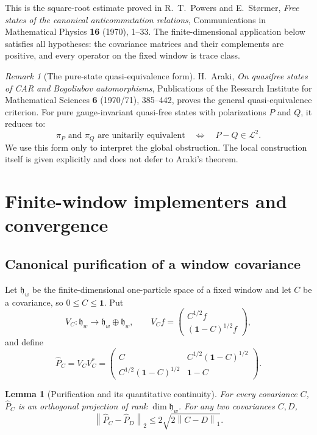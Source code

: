 \documentclass[11pt]{article}
\newtheorem{lemma}[theorem]{Lemma}
\theoremstyle{remark}
\newtheorem{remark}[theorem]{Remark}
\newcommand{\id}{\mathbf 1}
\newcommand{\norm}[1]{\left\lVert #1\right\rVert}
\begin{document}
This is the square-root estimate proved in
R.~T.~Powers and E.~St{\o}rmer,
\emph{Free states of the canonical anticommutation relations},
Communications in Mathematical Physics \textbf{16} (1970), 1--33.
The finite-dimensional application below satisfies all hypotheses:
the covariance matrices and their complements are positive, and every
operator on the fixed window is trace class.

\begin{remark}[The pure-state quasi-equivalence form]
H.~Araki, \emph{On quasifree states of CAR and Bogoliubov
automorphisms}, Publications of the Research Institute for Mathematical
Sciences \textbf{6} (1970/71), 385--442, proves the general
quasi-equivalence criterion.  For pure gauge-invariant quasi-free states
with polarizations $P$ and $Q$, it reduces to:
\[
 \pi_P\text{ and }\pi_Q\text{ are unitarily equivalent}
 \quad\Longleftrightarrow\quad P-Q\in\mathcal L^2.
\]
We use this form only to interpret the global obstruction.  The local
construction itself is given explicitly and does not defer to Araki's
theorem.
\end{remark}

\section{Finite-window implementers and convergence}
\label{sec:local}

\subsection{Canonical purification of a window covariance}

Let $\mathfrak h_w$ be the finite-dimensional one-particle space of a
fixed window and let $C$ be a covariance, so $0\le C\le\id$.  Put
\[
 V_C:\mathfrak h_w\longrightarrow\mathfrak h_w\oplus\mathfrak h_w,
 \qquad
 V_C f=
 \begin{pmatrix}C^{1/2}f\\(\id-C)^{1/2}f\end{pmatrix},
\]
and define
\[
 \widehat P_C=V_CV_C^*
 =
 \begin{pmatrix}
 C& C^{1/2}(\id-C)^{1/2}\\
 C^{1/2}(\id-C)^{1/2}&\id-C
 \end{pmatrix}.
\]

\begin{lemma}[Purification and its quantitative continuity]
\label{lem:purification}
For every covariance $C$, $\widehat P_C$ is an orthogonal projection of
rank $\dim\mathfrak h_w$.  For any two covariances $C,D$,
\[
 \norm{\widehat P_C-\widehat P_D}_2
 \le 2\sqrt{2\norm{C-D}_1}.
\tag{3.1}\label{eq:purification-bound}
\]
\end{lemma}
\end{document}
